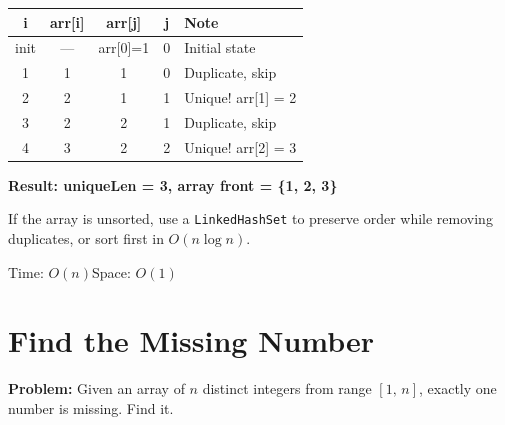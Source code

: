 \documentclass[12pt,a4paper,oneside]{book}
\begin{document}
\begin{dryrun}[Dry Run: arr = \{1, 1, 2, 2, 3\}]
\begin{center}
\begin{tabular}{ccccl}
\toprule
\textbf{i} & \textbf{arr[i]} & \textbf{arr[j]} & \textbf{j} & \textbf{Note}\\
\midrule
init & --- & arr[0]=1 & 0 & Initial state\\
1    & 1   & 1        & 0 & Duplicate, skip\\
2    & 2   & 1        & 1 & Unique! arr[1] = 2\\
3    & 2   & 2        & 1 & Duplicate, skip\\
4    & 3   & 2        & 2 & Unique! arr[2] = 3\\
\bottomrule
\end{tabular}
\end{center}
\textbf{Result: uniqueLen = 3, array front = \{1, 2, 3\}}
\end{dryrun}

\begin{warningbox}
If the array is unsorted, use a \texttt{LinkedHashSet} to preserve order while removing duplicates, or sort first in $O(n \log n)$.
\end{warningbox}

\begin{complexity}
Time: $O(n)$\quad Space: $O(1)$
\end{complexity}

\section{Find the Missing Number}

\textbf{Problem:} Given an array of $n$ distinct integers from range $[1,\, n]$, exactly one number is missing. Find it.
\end{document}
